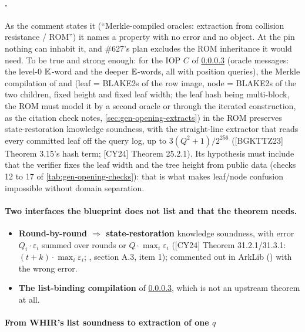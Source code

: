 \paragraph{.} As the comment states it (``Merkle-compiled oracles: extraction from
collision resistance / ROM'') it names a property with no error and no object. At the pin nothing
can inhabit it, and \#627's plan excludes the ROM inheritance it would need. To be true and strong
enough: for the IOP $C$ of \cref{sec:gen-opening-listbinding} (oracle messages: the level-0 $\mathbb{K}$-word
and the deeper $\mathbb{E}$-words, all with position queries), the Merkle compilation of
 and  (leaf = BLAKE2s of the row image, node =
BLAKE2s of the two children, fixed height and fixed leaf width; the leaf hash being multi-block, the
ROM must model it by a second oracle or through the iterated construction, as the citation check
notes, \cref{sec:gen-opening-extracts}) in the ROM preserves
state-restoration knowledge soundness, with the straight-line extractor that reads every committed
leaf off the query log, up to $3(Q^2+1)/2^{256}$ ([BGKTTZ23] Theorem 3.15's hash term; [CY24]
Theorem 25.2.1). Its hypothesis must include that the verifier fixes the leaf width and the tree
height from public data (checks 12 to 17 of \cref{tab:gen-opening-checks}): that is what makes
leaf/node confusion impossible without domain separation.

\paragraph{Two interfaces the blueprint does not list and that the theorem needs.}
\begin{itemize}
\item \textbf{Round-by-round $⇒$ state-restoration} knowledge soundness, with error $Q_i·ε_i$ summed
  over rounds or $Q·\max_i ε_i$ ([CY24] Theorem 31.2.1/31.3.1: $(t + k)·\max_i ε_i$;
  , section A.3, item 1); commented out in ArkLib
  () with the wrong error.
\item \textbf{The list-binding compilation} of \cref{sec:gen-opening-listbinding}, which is not an
  upstream theorem at all.
\end{itemize}

\paragraph{From WHIR's list soundness to extraction of one \texorpdfstring{$q$}{q}}\label{sec:gen-opening-listbinding}

